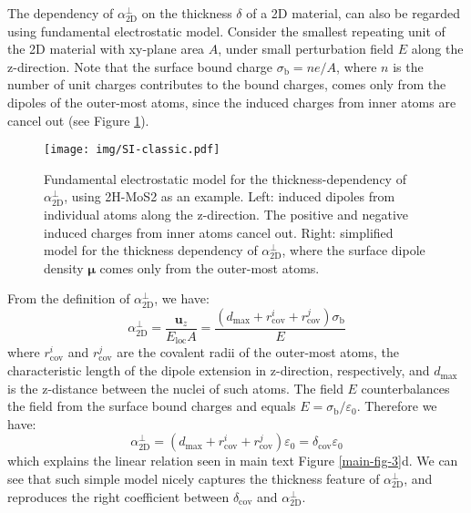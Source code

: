 \documentclass[manuscript=suppinfo,email=true,hyperref=true,keywords=false]{achemso}
\begin{document}
The dependency of $\alpha_{\mathrm{2D}}^{\perp}$ on the thickness
$\delta$ of a 2D material, can also be regarded using fundamental
electrostatic model. Consider the smallest repeating unit of the 2D
material with xy-plane area $A$, under small perturbation field $E$
along the z-direction.  Note that the surface bound charge
$\sigma_{\mathrm{b}}=n e /A$, where $n$ is the number of unit charges
contributes to the bound charges, comes only from the dipoles of the
outer-most atoms, since the induced charges from inner atoms are
cancel out (see Figure \ref{fig:classic-model}).
\begin{figure}[htbp]
  \centering
  \texttt{[image: img/SI-classic.pdf]}
  \caption{Fundamental electrostatic model for the
    thickness-dependency of $\alpha_{\mathrm{2D}}^{\perp}$, using 2H-MoS2 as an
    example. Left: induced dipoles from individual atoms along the
    z-direction. The positive and negative induced charges from inner
    atoms cancel out. Right: simplified model for the thickness
    dependency of $\alpha_{\mathrm{2D}}^{\perp}$, where the surface dipole density
    $\boldsymbol{\mu}$ comes only from the outer-most atoms.}
  \label{fig:classic-model}
\end{figure}
From the definition of
$\alpha_{\mathrm{2D}}^{\perp}$, we have:
\begin{equation}
  \label{eq:alpha-classic}
  \alpha_{\mathrm{2D}}^{\perp} = \frac{\boldsymbol{u}_{z}}{E_{\mathrm{loc}} A}
  = \frac{(d_{\mathrm{max}} + r_{\mathrm{cov}}^{i} + r_{\mathrm{cov}}^{j}) \sigma_{\mathrm{b}}}{E}
\end{equation}
where $r_{\mathrm{cov}}^{i}$ and $r_{\mathrm{cov}}^{j}$ are the
covalent radii of the outer-most atoms, the characteristic length of
the dipole extension in z-direction, respectively, and $d_{\mathrm{max}}$ is the
z-distance between the nuclei of such atoms.  The field $E$
counterbalances the field from the surface bound charges and equals
$E = \sigma_{\mathrm{b}}/\varepsilon_{0}$. Therefore we have:
\begin{equation}
  \label{eq:alpha-classic-2}
  \alpha_{\mathrm{2D}}^{\perp} = (d_{\mathrm{max}} + r_{\mathrm{cov}}^{i} + r_{\mathrm{cov}}^{j})\varepsilon_{0}
                = \delta_{\mathrm{cov}} \varepsilon_{0}
\end{equation}
which explains the linear relation seen in main text Figure
\ref{main-fig-3}d. We can see that such simple model nicely captures
the thickness feature of $\alpha_{\mathrm{2D}}^{\perp}$, and
reproduces the right coefficient between $\delta_{\mathrm{cov}}$ and
$\alpha_{\mathrm{2D}}^{\perp}$.
\end{document}

